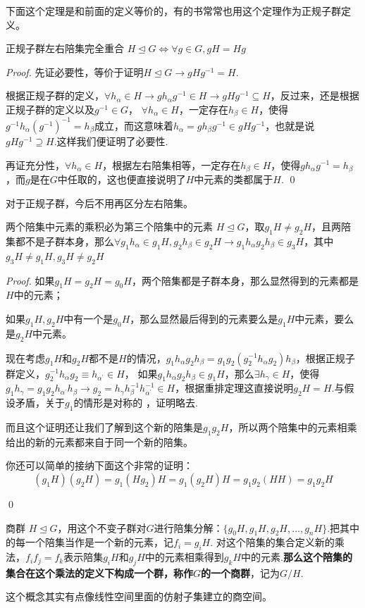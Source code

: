 下面这个定理是和前面的定义等价的，有的书常常也用这个定理作为正规子群定义。
\begin{theorem}{正规子群左右陪集完全重合}
    $H\unlhd G\iff \forall g\in G,gH=Hg$
\end{theorem}
\begin{proof}
    先证必要性，等价于证明$H\unlhd G\rightarrow gHg^{-1}=H$.

    根据正规子群的定义，$\forall h_\alpha\in H\rightarrow gh_\alpha g^{-1}\in H\rightarrow gHg^{-1}\subseteq H$，反过来，还是根据正规子群的定义以及$g^{-1}\in G$，
    $\forall h_\alpha\in H$，一定存在$h_\beta\in H$，使得$g^{-1}h_\alpha (g^{-1})^{-1}=h_\beta$成立，而这意味着$h_\alpha=g h_\beta g^{-1}\in gHg^{-1}$，也就是说$gHg^{-1}\supseteq H$.这样我们便证明了必要性.

    再证充分性，$\forall h_\alpha\in H$，根据左右陪集相等，一定存在$h_\beta\in H$，使得$gh_\alpha g^{-1}=h_\beta$，而$g$是在$G$中任取的，这也便直接说明了$H$中元素的类都属于$H$.
    \qed
\end{proof}
对于正规子群，今后不用再区分左右陪集。
\begin{theorem}{两个陪集中元素的乘积必为第三个陪集中的元素}
    $H\unlhd G$，取$g_1H\neq g_2H$，且两陪集都不是子群本身，那么$\forall g_1h_\alpha\in g_1H,g_2h_\beta\in g_2H\rightarrow g_1h_\alpha g_2h_\beta\in g_3H$，其中$g_3H\neq g_1H,g_3H\neq g_2H$
\end{theorem}
\begin{proof}
    如果$g_1H=g_2H=g_0H$，两个陪集都是子群本身，那么显然得到的元素都是$H$中的元素；

    如果$g_1H,g_2H$中有一个是$g_0H$，那么显然最后得到的元素要么是$g_1H$中元素，要么是$g_2H$中元素。

    现在考虑$g_1H$和$g_2H$都不是$H$的情况，$g_1h_\alpha g_2 h_\beta=g_1g_2(g_2^{-1}h_\alpha g_2 )h_\beta$，根据正规子群定义，$g_2^{-1}h_\alpha g_2\equiv h_{\alpha^\prime}\in H$，
    如果$g_1h_{\alpha} g_2 h_\beta\in g_1H$，那么$\exists h_\gamma\in H$，使得$g_1h_\gamma=g_1g_2h_{\alpha^\prime} h_\beta\rightarrow g_2=h_\gamma h_\beta^{-1} h_{\alpha^\prime}^{-1}\in H$，根据重排定理这直接说明$g_2 H=H$.与假设矛盾，关于$g_1$的情形是对称的
    ，证明略去. 

    而且这个证明还让我们了解到这个新的陪集是$g_1g_2H$，所以两个陪集中的元素相乘给出的新的元素都来自于同一个新的陪集。
    
    你还可以简单的接纳下面这个非常的证明：\[(g_1H)(g_2H)=g_1(Hg_2)H=g_1(g_2H)H=g_1g_2(HH)=g_1g_2H\]
    
    \qed
\end{proof}
\begin{define}{商群}
    $H\unlhd G$，用这个不变子群对$G$进行陪集分解：$\{g_0H,g_1H,g_2H,\ldots,g_nH\}$.把其中的每一个陪集当作是一个新的元素，记$f_i=g_iH$.
    对这个陪集的集合定义新的乘法，$f_if_j=f_k$表示陪集$g_iH$和$g_jH$中的元素相乘得到$g_kH$中的元素.\textbf{那么这个陪集的集合在这个乘法的定义下构成一个群，称作$G$的一个商群}，记为$G/H$.
\end{define}
这个概念其实有点像线性空间里面的仿射子集建立的商空间。

